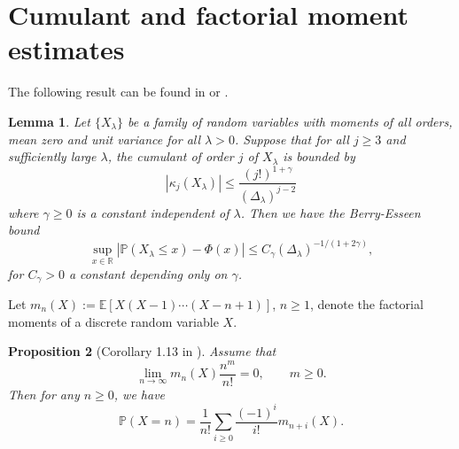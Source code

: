 \documentclass[12pt]{article}
\newcommand{\R}{\mathbb{R}}
\newcommand{\E}{\mathbb{E}}
\newcommand{\IP}{\mathbb{P}}
\newtheorem{prop}{Proposition}[section]
\newtheorem{lemma}[prop]{Lemma}
\def\P{\mathbb{P}}
\numberwithin{equation}{section}
\begin{document}
\section{Cumulant and factorial moment estimates} 
\label{statuleviciuscond}
\noindent
The following result can be found in
 \cite[Corollary~2.1]{saulis} or \cite[Theorem~2.4]{doering}. 
\begin{lemma}\label{Statuleviciuscond1}
  Let $\{X_\lambda\}$ be a family of random variables with moments
  of all orders, mean zero and unit variance for all $\lambda>0$.
  Suppose that for all $j\geq 3$ and sufficiently large $\lambda$,
  the cumulant of order $j$ of $X_\lambda$ is bounded by
\begin{equation}
\nonumber %
|\kappa_j(X_\lambda)|\leq \frac{(j!)^{1+\gamma}}{(\Delta_\lambda)^{j-2}}
\end{equation}
where $\gamma\ge0$ is a constant independent of $\lambda$.
Then we have the Berry-Esseen bound 
\begin{equation}
\nonumber
  \sup_{x\in\R}|\IP (X_\lambda\leq x)-\Phi(x)|\leq C_\gamma (\Delta_\lambda)^{-1/(1+2\gamma)},
\end{equation}
 for $C_\gamma>0$ a constant depending only on $\gamma$. 
\end{lemma}
Let
$m_n(X) := \E [ X(X-1) \cdots (X-n+1)]$,  
 $n \geq 1$, 
 denote the factorial moments
 of a discrete random variable $X$. 
\begin{prop}[Corollary 1.13 in \cite{bollobas}] 
  \label{fdshkf0}
  Assume that 
  $$
  \lim_{n\to \infty} m_n(X)\frac{n^m}{n!} =0,
  \qquad
 m\geq 0.
  $$ 
 Then for any $n\geq 0$, we have 
 \begin{equation}
   \label{fjkl32}
   \P (   X = n ) = 
\frac{1}{n!}
\sum_{i\geq 0} \frac{(-1)^i}{i!}
m_{n + i}(X).
\end{equation}
\end{prop}
\end{document}
